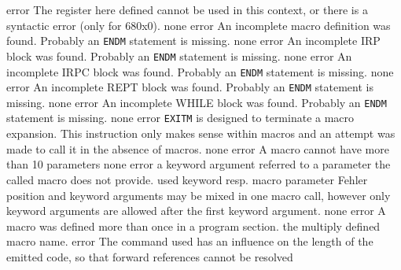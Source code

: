 \documentclass[12pt,twoside]{report}
\newcommand{\tty}[1]{{\tt #1}}
\begin{document}
\begin{description}
               {error}
               {The register here defined cannot be used in this context,
                or there is a syntactic error (only for 680x0).}
               {none}
               {error}
               {An incomplete macro definition was found. Probably an
                \tty{ENDM} statement is missing.}
               {none}
               {error}
               {An incomplete IRP block was found. Probably an
                \tty{ENDM} statement is missing.}
               {none}
               {error}
               {An incomplete IRPC block was found. Probably an
                \tty{ENDM} statement is missing.}
               {none}
               {error}
               {An incomplete REPT block was found. Probably an
                \tty{ENDM} statement is missing.}
               {none}
               {error}
               {An incomplete WHILE block was found. Probably an
                \tty{ENDM} statement is missing.}
               {none}
               {error}
               {\tty{EXITM} is designed to terminate a macro expansion.  This
                instruction only makes sense within macros and an attempt
                was made to call it in the absence of macros.}
               {none}
               {error}
               {A macro cannot have more than 10 parameters}
               {none}
               {error}
               {a keyword argument referred to a parameter the
                called macro does not provide.}
               {used keyword resp. macro parameter}
               {Fehler}
               {position and keyword arguments  may be mixed in
                one macro call, however only keyword arguments
                are allowed after the first keyword argument.}
               {none}
               {error}
               {A macro was defined more than once in a program section.}
               {the multiply defined macro name.}
               {error}
               {The command used has an influence on the length of the
                emitted code, so that forward references cannot be resolved
}
\end{description}
\end{document}
